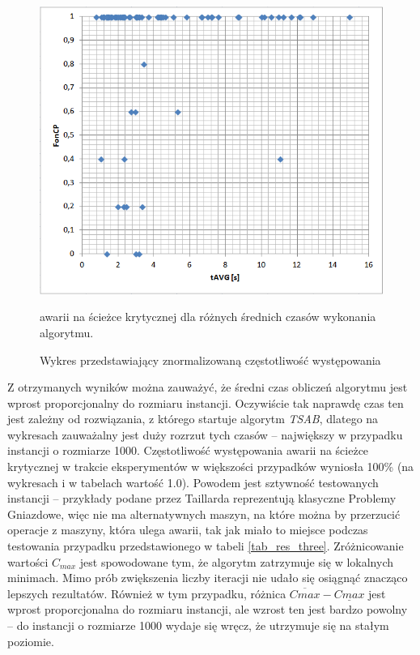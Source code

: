 \documentclass[archivemode]{mgr}
\begin{document}
%
\begin{figure}[t!]
\begin{center}
\includegraphics[scale=0.68]{rysunki/wykres_czas_FonCP.png}
\caption{Wykres przedstawiający znormalizowaną częstotliwość występowania}{awarii na ścieżce krytycznej dla różnych średnich czasów wykonania algorytmu.}
\label{rys_wykres_czas_FonCP}
\end{center}
\end{figure}
%
Z otrzymanych wyników można zauważyć, że średni czas obliczeń algorytmu jest wprost proporcjonalny do rozmiaru instancji. Oczywiście tak naprawdę czas ten jest zależny od rozwiązania, z którego startuje algorytm \emph{TSAB}, dlatego na wykresach zauważalny jest duży rozrzut tych czasów -- największy w przypadku instancji o rozmiarze 1000. Częstotliwość występowania awarii na ścieżce krytycznej w trakcie eksperymentów w większości przypadków wyniosła 100\% (na wykresach i w tabelach wartość 1.0). Powodem jest sztywność testowanych instancji -- przykłady podane przez Taillarda reprezentują klasyczne Problemy Gniazdowe, więc nie ma alternatywnych maszyn, na które można by przerzucić operacje z maszyny, która ulega awarii, tak jak miało to miejsce podczas testowania przypadku przedstawionego w tabeli \ref{tab_res_three}. Zróżnicowanie wartości $C_{max}$ jest spowodowane tym, że algorytm zatrzymuje się w lokalnych minimach. Mimo prób zwiększenia liczby iteracji nie udało się osiągnąć znacząco lepszych rezultatów. Również w tym przypadku, różnica $\overline{C{max}} - \underline{C{max}}$ jest wprost proporcjonalna do rozmiaru instancji, ale wzrost ten jest bardzo powolny -- do instancji o rozmiarze 1000 wydaje się wręcz, że utrzymuje się na stałym poziomie.
\end{document}
